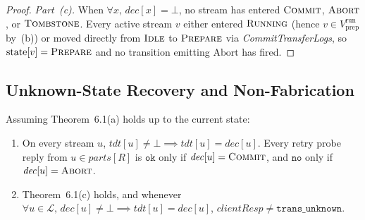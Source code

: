 \documentclass[sigconf,nonacm]{acmart}
\newcommand{\stIdle}{\textsc{Idle}}
\newcommand{\stRun}{\textsc{Running}}
\newcommand{\stPrep}{\textsc{Prepare}}
\newcommand{\stCom}{\textsc{Commit}}
\newcommand{\stAbt}{\textsc{Abort}}
\newcommand{\stTomb}{\textsc{Tombstone}}
\newcommand{\parts}{\mathit{parts}}
\newcommand{\tdt}{\mathit{tdt}}
\newcommand{\dec}{\mathit{dec}}
\begin{document}
\begin{proof}
\emph{Part~(c).} When \(\forall x,\, \dec[x] = \bot\), no stream has entered
\(\stCom\), \(\stAbt\), or \(\stTomb\). Every active stream \(v\) either
entered \(\stRun\) (hence \(v \in V_{\mathrm{prep}}^{\mathrm{run}}\) by~(b))
or moved directly from \(\stIdle\) to \(\stPrep\) via
\emph{CommitTransferLogs}, so \(\mathrm{state}[v] = \stPrep\) and no
transition emitting \(\mathrm{Abort}\) has fired.
\end{proof}

\subsection{Unknown-State Recovery and Non-Fabrication}
\label{sec:unknown}
\begin{lemma}\label{lem:unknown}
Assuming Theorem~6.1(a) holds up to the current state:
\begin{enumerate}
  \item[\emph{(a)}] On every stream \(u\), \(\tdt[u] \neq \bot \implies
    \tdt[u] = \dec[u]\). Every retry probe reply from \(u \in \parts[R]\) is
    \(\mathtt{ok}\) only if \(\dec[u] = \stCom\), and \(\mathtt{no}\) only if
    \(\dec[u] = \stAbt\).
  \item[\emph{(b)}] Theorem~6.1(c) holds, and whenever \(\forall u \in
    \mathcal{L},\, \dec[u] \neq \bot \implies \tdt[u] = \dec[u]\),
    \(\mathit{clientResp} \neq \mathtt{trans\_unknown}\).
\end{enumerate}
\end{lemma}
\end{document}
